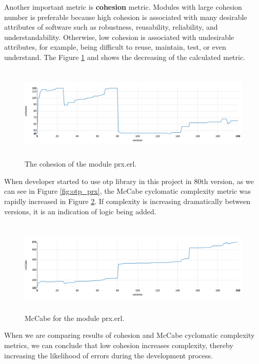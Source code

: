 Another important metric is \textbf{cohesion} metric. Modules with large cohesion number is preferable because high cohesion is associated with many desirable attributes of software such as robustness, reusability, reliability, and understandability. Otherwise, low cohesion is associated with undesirable attributes, for example, being difficult to reuse, maintain, test, or even understand. The Figure \ref{fig:cohesion_prx} and shows the decreasing of the calculated metric. 

\begin{figure}[h]
	\centering
	\includegraphics[height=45mm]{figures/cohesion_prx.png}
	\caption{The cohesion of the module prx.erl.}
	\label{fig:cohesion_prx}
\end{figure}

When developer started to use otp library in this project in 80th version, as we can see in Figure \ref{fig:otp_prx}, the McCabe cyclomatic complexity metric was rapidly increased in Figure \ref{fig:McCabe}. If complexity is increasing dramatically between versions, it is an indication of logic 
being added. 

\begin{figure}[h]
	\centering
	\includegraphics[height=45mm]{figures/mccabe.png}
	\caption{McCabe for the module prx.erl.}
	\label{fig:McCabe}
\end{figure}

When we are comparing results of cohesion and McCabe cyclomatic complexity metrics, we can conclude that low cohesion increases complexity, thereby increasing the likelihood of errors during the development process.

